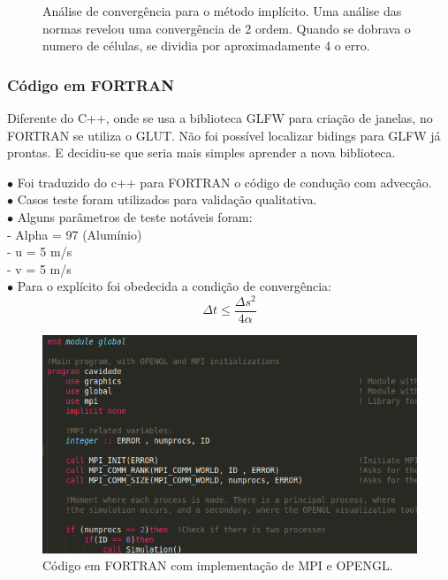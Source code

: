 \documentclass[xcolor=dvipsnames,10pt,aspectratio=169]{beamer}
\begin{document}
\begin{frame}
\begin{minipage}[h!]{0.49\textwidth}
\begin{figure}[h!]
				\caption{ Análise de convergência para o método implícito. Uma análise das normas revelou uma convergência de 2 ordem. Quando se dobrava o numero de células, se dividia por aproximadamente 4 o erro.}
			\end{figure}
		\end{minipage}
	\end{frame}





	\begin{frame}
		\frametitle{Código em FORTRAN}
		\begin{minipage}[h!]{0.49\textwidth}

			Diferente do C++, onde se usa a biblioteca GLFW para criação de janelas, no FORTRAN se utiliza o GLUT. Não foi possível localizar bidings para GLFW já prontas. E decidiu-se que seria mais simples aprender a nova biblioteca.

			$\bullet$ Foi traduzido do c++ para FORTRAN o código de condução com advecção.\\
			$\bullet$ Casos teste foram utilizados para validação qualitativa.\\
			$\bullet$ Alguns parâmetros de teste notáveis foram: \\
			- Alpha = 97 (Alumínio) \\
			- u = 5 m/s \\
			- v = 5 m/s \\
			$\bullet$ Para o explícito foi obedecida a condição de convergência:
			\begin{equation}
			\Delta t \leq \frac{\Delta s ^2}{4 \alpha}
			\end{equation}
		\end{minipage}
		\begin{minipage}[h!]{0.49\textwidth}
			\begin{figure}[h!]
				\centering
				\includegraphics[trim = {0cm 1cm 5cm 1cm}, clip , angle=0, scale=0.45]{images/fortran_code}
				\caption{Código em FORTRAN com implementação de MPI e OPENGL.}
			\end{figure}
		\end{minipage}
	\end{frame}
\end{document}
